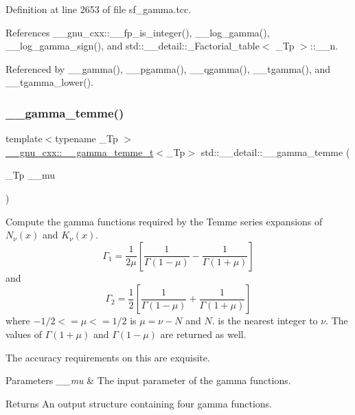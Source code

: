Definition at line 2653 of file sf\+\_\+gamma.\+tcc.



References \+\_\+\+\_\+gnu\+\_\+cxx\+::\+\_\+\+\_\+fp\+\_\+is\+\_\+integer(), \+\_\+\+\_\+log\+\_\+gamma(), \+\_\+\+\_\+log\+\_\+gamma\+\_\+sign(), and std\+::\+\_\+\+\_\+detail\+::\+\_\+\+Factorial\+\_\+table$<$ \+\_\+\+Tp $>$\+::\+\_\+\+\_\+n.



Referenced by \+\_\+\+\_\+gamma(), \+\_\+\+\_\+pgamma(), \+\_\+\+\_\+qgamma(), \+\_\+\+\_\+tgamma(), and \+\_\+\+\_\+tgamma\+\_\+lower().

\mbox{\label{namespacestd_1_1____detail_a0d4fa90f527fd05d057b27ba0366488a}} 
\subsubsection{\texorpdfstring{\+\_\+\+\_\+gamma\+\_\+temme()}{\_\_gamma\_temme()}}
{\footnotesize\ttfamily template$<$typename \+\_\+\+Tp $>$ \\
\hyperlink{struct____gnu__cxx_1_1____gamma__temme__t}{\+\_\+\+\_\+gnu\+\_\+cxx\+::\+\_\+\+\_\+gamma\+\_\+temme\+\_\+t}$<$\+\_\+\+Tp$>$ std\+::\+\_\+\+\_\+detail\+::\+\_\+\+\_\+gamma\+\_\+temme (\begin{DoxyParamCaption}\item[{\+\_\+\+Tp}]{\+\_\+\+\_\+mu }\end{DoxyParamCaption})}



Compute the gamma functions required by the Temme series expansions of $ N_\nu(x) $ and $ K_\nu(x) $. \[ \Gamma_1 = \frac{1}{2\mu} \left[\frac{1}{\Gamma(1 - \mu)} - \frac{1}{\Gamma(1 + \mu)}\right] \] and \[ \Gamma_2 = \frac{1}{2} \left[\frac{1}{\Gamma(1 - \mu)} + \frac{1}{\Gamma(1 + \mu)}\right] \] where $ -1/2 <= \mu <= 1/2 $ is $ \mu = \nu - N $ and $ N $. is the nearest integer to $ \nu $. The values of $ \Gamma(1 + \mu) $ and $ \Gamma(1 - \mu) $ are returned as well. 

The accuracy requirements on this are exquisite.


\begin{DoxyParams}{Parameters}
{\em \+\_\+\+\_\+mu} & The input parameter of the gamma functions. \\
\hline
\end{DoxyParams}
\begin{DoxyReturn}{Returns}
An output structure containing four gamma functions. 
\end{DoxyReturn}


